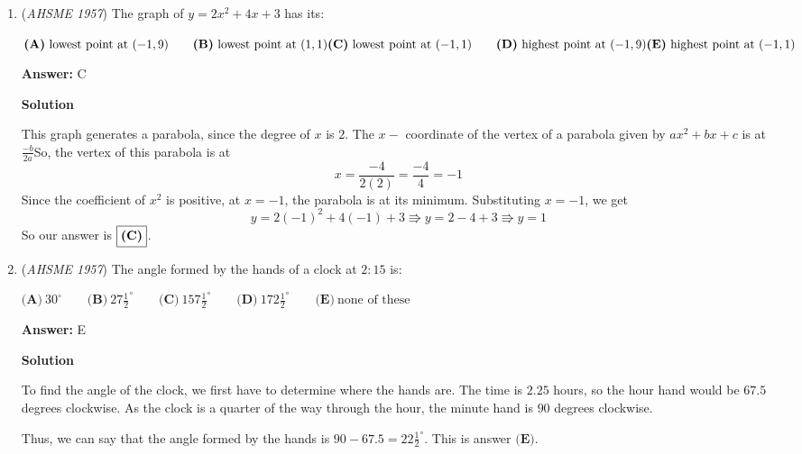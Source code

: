 \begin{enumerate}
 \textbf{Answer: }B



\textbf{Solution}

Just plug in the numbers and follow the order of operations:
 \[2-(-2)^{2-(-2)}\]
 \[2-(-2)^4\]
 \[2-16\]
 \[\boxed{\textbf{(B) }-14}\]



	\item (\textit{AHSME 1957}) The graph of $y = 2x^2 + 4x + 3$ has its: 


 $\textbf{(A)}\ \text{lowest point at } {(-1,9)}\qquad   \textbf{(B)}\ \text{lowest point at } {(1,1)}\qquad \\  \textbf{(C)}\ \text{lowest point at }{(-1,1)}\qquad \textbf{(D)}\ \text{highest point at }{(-1,9)}\qquad\\  \textbf{(E)}\ \text{highest point at }{(-1,1)}$

 \textbf{Answer: }C



\textbf{Solution}

This graph generates a parabola, since the degree of $x$ is $2$. The $x-$ coordinate of the vertex of a parabola given by $ax^2 + bx + c$ is at $\frac{-b}{2a}$So, the vertex of this parabola is at 
 \[x = \frac{-4}{2(2)} = \frac{-4}{4} = -1\]Since the coefficient of $x^2$ is positive, at $x = -1$, the parabola is at its minimum. Substituting $x = -1$, we get
 \[y = 2(-1)^2 + 4(-1) + 3 \Rrightarrow y = 2 -4 + 3 \Rrightarrow y = 1\]So our answer is $\fbox{\textbf{(C)}}$.

 


 


	\item (\textit{AHSME 1957}) The angle formed by the hands of a clock at $2:15$ is: 


 $\textbf{(A)}\ 30^\circ \qquad \textbf{(B)}\ 27\frac{1}{2}^\circ\qquad  \textbf{(C)}\ 157\frac{1}{2}^\circ\qquad  \textbf{(D)}\ 172\frac{1}{2}^\circ\qquad \textbf{(E)}\ \text{none of these}$

 \textbf{Answer: }E



\textbf{Solution}

To find the angle of the clock, we first have to determine where the hands are. The time is $2.25$ hours, so the hour hand would be $67.5$ degrees clockwise. As the clock is a quarter of the way through the hour, the minute hand is $90$ degrees clockwise.

 Thus, we can say that the angle formed by the hands is $90 - 67.5 = 22\frac{1}{2}^\circ$.  This is answer  $\boxed{\textbf{(E)}}$.


\end{enumerate}
